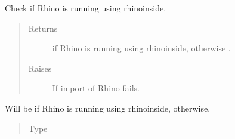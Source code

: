 \documentclass[letterpaper,10pt,english]{sphinxmanual}
\begin{document}
\begin{fulllineitems}
\label{\detokenize{cockatoo:cockatoo.environment.is_rhino_inside}}
Check if Rhino is running using rhinoinside.
\begin{quote}\begin{description}
\item[{Returns}] \leavevmode
{} \textendash{}  if Rhino is running using rhinoinside, otherwise .

\item[{Raises}] \leavevmode
{\hyperref[\detokenize{cockatoo:cockatoo.exception.RhinoNotPresentError}]{}} \textendash{} If import of Rhino fails.

\end{description}\end{quote}

\end{fulllineitems}


\begin{fulllineitems}
\label{\detokenize{cockatoo:cockatoo.environment.RHINOINSIDE}}
Will be  if Rhino is running using rhinoinside,  otherwise.
\begin{quote}\begin{description}
\item[{Type}] \leavevmode
{}

\end{description}\end{quote}

\end{fulllineitems}

\end{document}
